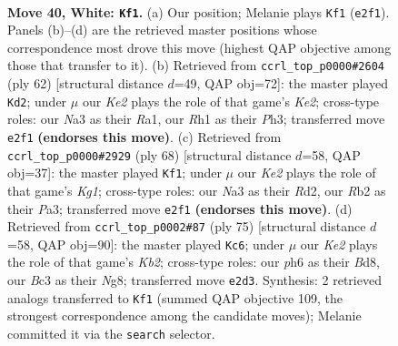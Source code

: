 \documentclass[11pt]{article}
\begin{document}
\clearpage

\begin{figure}[p]\centering
\begin{subfigure}{0.46\textwidth}\centering
\resizebox{\linewidth}{!}{%
\newchessgame
\chessboard[
  setfen={1rr5/pn3p1k/1p2p1pp/7P/2P5/N1B1P3/PR2KPP1/7R w - - 1 40},
  showmover=false,
  pgfstyle=straightmove, color=movearrow, markmove={e2-f1}
]}
\caption{}
\end{subfigure}\hfill
\begin{subfigure}{0.46\textwidth}\centering
\resizebox{\linewidth}{!}{%
\newchessgame
\chessboard[
  setfen={r7/r3bkpp/1p2p3/1Pp2p2/P1R3P1/4P2P/1B2KP2/R7 w - - 0 32},
  showmover=false,
  pgfstyle=straightmove, color=movearrow, markmove={e2-d2}
]}
\caption{}
\end{subfigure}
\\[4pt]
\begin{subfigure}{0.46\textwidth}\centering
\resizebox{\linewidth}{!}{%
\newchessgame
\chessboard[
  setfen={3r1k2/3r1p2/p2Pp1p1/1p2R2p/8/P1P3PP/1P1R1P2/6K1 w - - 1 35},
  showmover=false,
  pgfstyle=straightmove, color=movearrow, markmove={g1-f1}
]}
\caption{}
\end{subfigure}\hfill
\begin{subfigure}{0.46\textwidth}\centering
\resizebox{\linewidth}{!}{%
\newchessgame
\chessboard[
  setfen={3br1n1/1kp2r2/p7/1pp1Pp2/P6p/2N4P/1PP3PB/4RR1K b - - 0 38},
  showmover=false,
  pgfstyle=straightmove, color=movearrow, markmove={b7-c6}
]}
\caption{}
\end{subfigure}
\caption{\textbf{Move 40, White: \texttt{Kf1}.} (a) Our position; Melanie plays \texttt{Kf1} (\texttt{e2f1}). Panels (b)--(d) are the retrieved master positions whose correspondence most drove this move (highest QAP objective among those that transfer to it). (b) Retrieved from \texttt{ccrl\_top\_p0000\#2604} (ply 62) [structural distance $d$=49, QAP obj=72]: the master played \texttt{Kd2}; under $\mu$ our \emph{Ke2} plays the role of that game's \emph{Ke2}; cross-type roles: our \emph{N}a3 as their \emph{R}a1, our \emph{R}h1 as their \emph{P}h3; transferred move \texttt{e2f1} \textbf{(endorses this move)}. (c) Retrieved from \texttt{ccrl\_top\_p0000\#2929} (ply 68) [structural distance $d$=58, QAP obj=37]: the master played \texttt{Kf1}; under $\mu$ our \emph{Ke2} plays the role of that game's \emph{Kg1}; cross-type roles: our \emph{N}a3 as their \emph{R}d2, our \emph{R}b2 as their \emph{P}a3; transferred move \texttt{e2f1} \textbf{(endorses this move)}. (d) Retrieved from \texttt{ccrl\_top\_p0002\#87} (ply 75) [structural distance $d$=58, QAP obj=90]: the master played \texttt{Kc6}; under $\mu$ our \emph{Ke2} plays the role of that game's \emph{Kb2}; cross-type roles: our \emph{p}h6 as their \emph{B}d8, our \emph{B}c3 as their \emph{N}g8; transferred move \texttt{e2d3}. Synthesis: 2 retrieved analogs transferred to \texttt{Kf1} (summed QAP objective 109, the strongest correspondence among the candidate moves); Melanie committed it via the \texttt{search} selector.}
\label{fig:thought-m78}
\end{figure}
\end{document}
